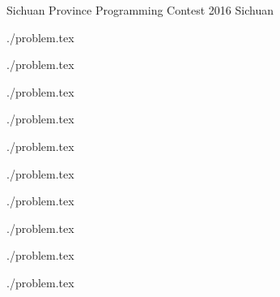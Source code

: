 \documentclass [11pt, a4paper, oneside] {article}
\begin{document}
\contest
{Sichuan Province Programming Contest 2016}%
{Sichuan}%
{}%


\renewcommand{\t}{\texttt}


\graphicspath{{../../problems/kd-tree-subroutine/statements/english/}}
{./problem.tex}
\graphicspath{{../../problems/odd-discount/statements/english/}}
{./problem.tex}
\graphicspath{{../../problems/queen-dominating-set-count/statements/english/}}
{./problem.tex}
\graphicspath{{../../problems/set-longest-common-subsequence/statements/english/}}
{./problem.tex}
\graphicspath{{../../problems/knapsack-123/statements/english/}}
{./problem.tex}
\graphicspath{{../../problems/sparse-graph-shortest-path-query/statements/english/}}
{./problem.tex}
\graphicspath{{../../problems/square-connectivity/statements/english/}}
{./problem.tex}
\graphicspath{{../../problems/tree-eulerian-cycle-count/statements/english/}}
{./problem.tex}
\graphicspath{{../../problems/lis-5-count/statements/english/}}
{./problem.tex}
\graphicspath{{../../problems/matrix-shift/statements/english/}}
{./problem.tex}
\end{document}
